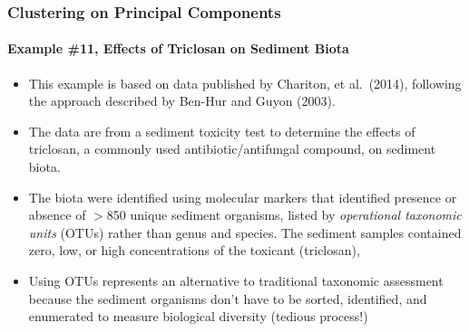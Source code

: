 \documentclass[10pt]{beamer}
\begin{document}
\begin{frame}[fragile]
\frametitle{Clustering on Principal Components}
\framesubtitle{Example \#11, Effects of Triclosan on Sediment Biota}

{\footnotesize
\begin{itemize}
\item This example is based on data published by Chariton, et
  al.~(2014), following the approach described by Ben-Hur and Guyon
  (2003).

\vspace{1ex}
\item The data are from a sediment toxicity test to determine the
  effects of triclosan, a commonly used antibiotic/antifungal
  compound, on sediment biota.

\vspace{1ex}
\item The biota were identified using molecular markers that
  identified presence or absence of $>$850 unique sediment
  organisms, listed by {\color{blue} \em operational taxonomic
    units} (OTUs) rather than genus and species.  The sediment samples
  contained zero, low, or high concentrations of the toxicant
  (triclosan),

\vspace{1ex}
\item Using OTUs represents an alternative to traditional taxonomic
  assessment because the sediment organisms don't have to
  be sorted, identified, and enumerated to measure biological
  diversity (tedious process!)\\
\end{itemize}
}
\end{frame}
\end{document}

